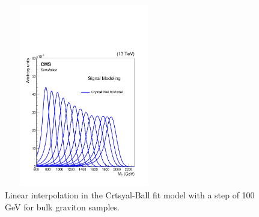 \begin{figure}[!ht]
\caption{ Linear interpolation in the Crtsyal-Ball fit model with a step of 100 GeV for bulk graviton samples.}
\begin{center}
  \includegraphics[height=8cm,width=7cm]{figuresARC/fits/testRGS.pdf} 
\end{center}
\label{fig:fits9}
\end{figure}



